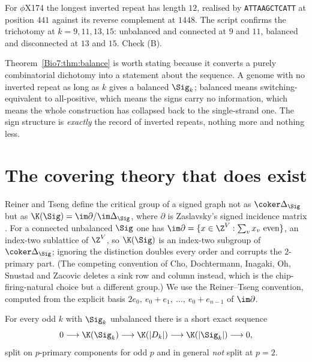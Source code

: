 For $\phi$X174 the longest inverted repeat has length $12$, realised by
\texttt{ATTAAGCTCATT} at position $441$ against its reverse complement at $1448$. The script
confirms the trichotomy at $k=9,11,13,15$: unbalanced and connected at $9$ and $11$,
balanced and disconnected at $13$ and $15$. Check (B).

Theorem~\ref{Bio7:thm:balance} is worth stating because it converts a purely combinatorial
dichotomy into a statement about the sequence. A genome with no inverted repeat as long as
$k$ gives a balanced $\Sig_k$; balanced means switching-equivalent to all-positive, which
means the signs carry no information, which means the whole construction has collapsed back
to the single-strand one. The sign structure is \emph{exactly} the record of inverted
repeats, nothing more and nothing less.

\section{The covering theory that does exist}\label{Bio7:sec:rt}

Reiner and Tseng define the critical group of a signed graph not as $\coker\Delta_\Sig$ but
as $\K(\Sig)=\im\partial/\im\Delta_\Sig$, where $\partial$ is Zaslavsky's signed incidence
matrix \cite[eq.~(1.3), \S9]{RT14}. For a connected unbalanced $\Sig$ one has
$\im\partial=\{x\in\Z^V:\sum_v x_v\ \text{even}\}$, an index-two sublattice of $\Z^V$, so
$\K(\Sig)$ is an index-two subgroup of $\coker\Delta_\Sig$; ignoring the distinction doubles
every order and corrupts the $2$-primary part. (The competing convention of Cho, Dochtermann,
Inagaki, Oh, Snustad and Zacovic \cite{CDIOSZ} deletes a sink row and column instead, which
is the chip-firing-natural choice but a different group.) We use the Reiner--Tseng
convention, computed from the explicit basis $2e_0,\ e_0+e_1,\ \dots,\ e_0+e_{n-1}$ of
$\im\partial$.

\begin{theorem}\label{Bio7:thm:rt}
For every odd $k$ with $\Sig_k$ unbalanced there is a short exact sequence
\[
  0\longrightarrow \K(\Sig_k)\longrightarrow \K(|D_k|)\longrightarrow \K(|\Sig_k|)
  \longrightarrow 0 ,
\]
split on $p$-primary components for odd $p$ and in general \emph{not} split at $p=2$.
\end{theorem}

